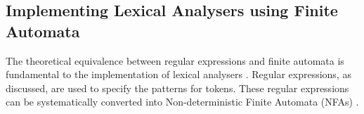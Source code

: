 
\subsection{Implementing Lexical Analysers using Finite Automata}

The theoretical equivalence between regular expressions and finite automata is fundamental to the implementation of lexical analysers \cite{aho2007compilers}. Regular expressions, as discussed, are used to specify the patterns for tokens. These regular expressions can be systematically converted into Non-deterministic Finite Automata (NFAs) \cite{aho2007compilers}.

